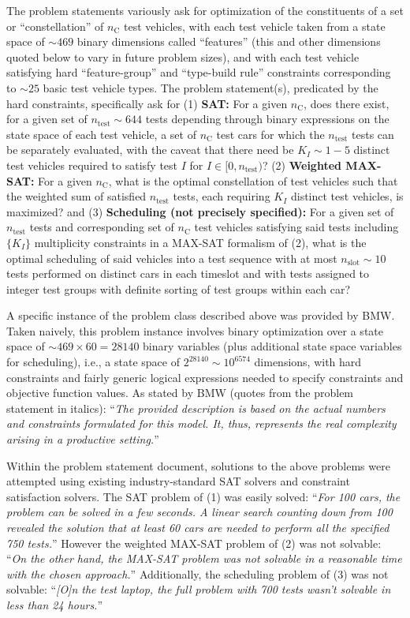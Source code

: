 \documentclass[aps,pra,twocolumn,superscriptaddress,groupedaddress]{revtex4}  %
\begin{document}
The problem statements variously ask for optimization of the constituents of a
set or
``constellation'' of $n_{\mathrm{C}}$ test vehicles, with each test vehicle taken
from a state space of $\sim 469$ binary dimensions called ``features'' (this and other dimensions
quoted below to vary
in future problem sizes), and with each test vehicle 
satisfying hard ``feature-group'' and ``type-build rule'' constraints
corresponding to $\sim 25$ basic test vehicle types. The problem
statement(s), predicated by the hard constraints, specifically ask for
(1) \textbf{SAT:} 
For a given $n_{\mathrm{C}}$, does there exist, for a given set of
$n_{\mathrm{test}} \sim 644$ tests depending through binary expressions on the state
space of each test vehicle, a set of $n_{\mathrm{C}}$ test cars for which the
$n_{\mathrm{test}}$ tests can be separately evaluated, with the caveat 
that there need be $K_I \sim 1-5$ distinct
test vehicles required to satisfy test $I$ for $I \in [0, n_{\mathrm{test}})$?
(2) \textbf{Weighted MAX-SAT:} For a given $n_{\mathrm{C}}$, what is the optimal
constellation of test vehicles such that the weighted sum of satisfied $n_{\mathrm{test}}$
tests, each requiring $K_I$ distinct test vehicles, is maximized? and 
(3) \textbf{Scheduling (not precisely specified):} For a given set of
$n_{\mathrm{test}}$ tests and corresponding set of $n_{\mathrm{C}}$ test
vehicles satisfying said tests including $\{ K_I \}$ multiplicity constraints in
a MAX-SAT formalism of (2), what is the optimal scheduling of said vehicles into 
a test sequence with at most $n_{\mathrm{slot}} \sim 10$ tests performed on
distinct cars in each timeslot and with tests assigned to integer test groups
with definite sorting of test groups within each car?

A specific instance of the problem class described above was provided by BMW.
Taken naively, this problem instance involves binary optimization over a state
space of $\sim 469\times60 = 28140$ binary variables (plus additional state
space variables for scheduling), i.e., a state space of $2^{28140} \sim
10^{6574}$ dimensions, with hard constraints and fairly generic logical
expressions needed to specify constraints and objective function values.  As
stated by BMW (quotes from the problem statement in italics): ``\textit{The
provided description is based on the actual numbers and constraints formulated
for this model. It, thus, represents the real complexity arising in a productive
setting.}''

Within the problem statement document, solutions to the above problems were
attempted using existing industry-standard SAT solvers and constraint
satisfaction solvers. The SAT problem of (1) was easily solved:
``\textit{For 100 cars, the problem can be solved in a few seconds. A linear search counting down
from 100 revealed the solution that at least 60 cars are needed to perform all the specified
750 tests.}''
However the weighted MAX-SAT problem of (2) was not solvable:
``\textit{On the other hand, the MAX-SAT problem was not solvable in a reasonable time with the
chosen approach.}''
Additionally, the scheduling problem of (3) was not solvable:
``\textit{[O]n the test laptop, the full problem with 700 tests wasn't solvable in less than 24
hours.}''
\end{document}
